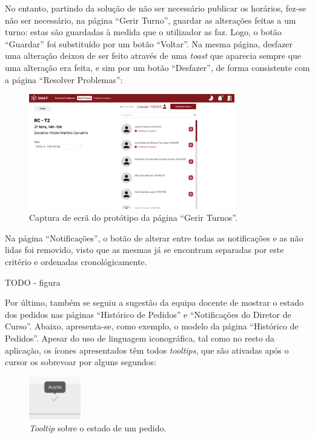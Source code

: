 \documentclass[12pt, a4paper]{article}
\begin{document}
No entanto, partindo da solução de não ser necessário publicar os horários, fez-se não ser
necessário, na página ``Gerir Turno'', guardar as alterações feitas a um turno: estas são guardadas
à medida que o utilizador as faz. Logo, o botão ``Guardar'' foi substituído por um botão ``Voltar''.
Na mesma página, desfazer uma alteração deixou de ser feito através de uma \emph{toast} que aparecia
sempre que uma alteração era feita, e sim por um botão ``Desfazer'', de forma consistente com a
página ``Resolver Problemas'':

\begin{figure}[H]
    \centering
    \includegraphics[width=0.8\textwidth]{res/prototype/gerir-turnos-revisto.png}
    \caption{Captura de ecrã do protótipo da página ``Gerir Turnos''.}
    \label{gerir-turnos-revisto}
\end{figure}

Na página ``Notificações'', o botão de alterar entre todas as notificações e as não lidas
foi removido, visto que as mesmas já se encontram separadas por este critério e ordenadas
cronológicamente.

{\color{red} TODO - figura}

Por último, também se seguiu a sugestão da equipa docente de mostrar o estado dos pedidos nas
páginas ``Histórico de Pedidos'' e ``Notificações do Diretor de Curso''. Abaixo, apresenta-se, como
exemplo, o modelo da página ``Histórico de Pedidos''. Apesar do uso de linguagem iconográfica, tal
como no resto da aplicação, os ícones apresentados têm todos \emph{tooltips}, que são ativadas após
o cursor os sobrevoar por alguns segundos:

\begin{figure}[H]
    \centering
    \includegraphics[width=0.2\textwidth]{res/prototype/estado-pedido-tooltip.png}
    \caption{\emph{Tooltip} sobre o estado de um pedido.}
    \label{estado-pedido-tooltip}
\end{figure}
\end{document}
